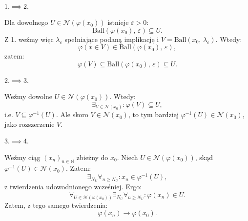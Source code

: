 \documentclass{article}
\numberwithin{defi}{section}
\numberwithin{defi}{section}
\newcommand{\N}{\mathbb{N}}
\newcommand{\Nau}{\mathcal{N}}
\providecommand{\eps}{\varepsilon}
\newcommand{\ciag}[1]{(#1_{n})_{n \in \N}}
\newcommand{\ball}[2]{\text{Ball}(#1, \, #2)}
\begin{document}
\begin{dow}
    \paragraph{$1. \implies 2.$}
    Dla dowolnego $U \in \Nau(\varphi(x_0))$ istnieje $\eps > 0$: \begin{equation*}
        \ball{\varphi(x_0)}{\eps} \subseteq U.
    \end{equation*} Z 1. weźmy więc $\lambda_\eps$ spełniające podaną implikację i $V = \ball{x_0}{\lambda_\eps}$. Wtedy: \begin{equation*}
        \varphi( x \in V) \in \ball{\varphi(x_0)}{\eps},
    \end{equation*} zatem: \begin{equation*}
        \varphi(V) \subseteq \ball{\varphi(x_0)}{\eps} \subseteq U.
    \end{equation*}

    \paragraph{$2. \implies 3.$}
    Weźmy dowolne $U \in \Nau(\varphi(x_0))$. Wtedy: \begin{equation*}
        \exists_{V \in \Nau(x_0)}: \varphi(V) \subseteq U,
    \end{equation*} i.e. $V \subseteq \varphi^{-1}(U)$. Ale skoro $V \in \Nau(x_0)$, to tym bardziej $\varphi^{-1}(U) \in \Nau(x_0)$, jako rozszerzenie $V$.

    \paragraph{$3. \implies 4.$}
    Weźmy ciąg $\ciag{x}$ zbieżny do $x_0$. Niech $U \in \Nau(\varphi(x_0))$, skąd $\varphi^{-1}(U) \in \Nau(x_0)$. Zatem: \begin{equation*}
        \exists_{N_U} \forall_{n \geqslant N_U}: x_n \in \varphi^{-1}(U),
    \end{equation*} z twierdzenia udowodnionego wcześniej. %
    Ergo: \begin{equation*}
        \forall_{U \in \Nau(\varphi(x_0))} \exists_{N_U} \forall_{n \geqslant N_U}: \varphi(x_n) \in U.
    \end{equation*} Zatem, z tego samego twierdzenia: \begin{equation*}
        \varphi(x_n) \to \varphi(x_0).
    \end{equation*}


\end{dow}
\end{document}
